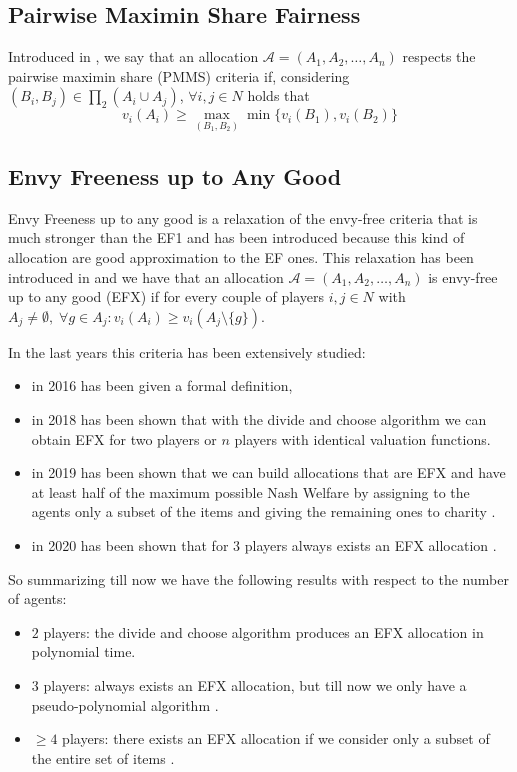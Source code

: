 \subsection{Pairwise Maximin Share Fairness}
Introduced in \cite{DBLP:/CaragiannisKMP016-EFX-PMMS}, we say that an allocation $\mathcal{A} = (A_1, A_2, \dots, A_n)$ respects the pairwise maximin share (PMMS) criteria if, considering $(B_i, B_j)\in \prod_2(A_i\cup A_j)$,  $\forall i,j\in N$ holds that 
$$
v_i(A_i) \ge \max_{(B_1, B_2)} \min \{v_i(B_1), v_i(B_2)\}
$$

\subsection{Envy Freeness up to Any Good}
Envy Freeness up to any good is a relaxation of the envy-free criteria that is much stronger than the EF1 and has been introduced because this kind of allocation are good approximation to the EF ones.  
This relaxation has been introduced in \cite{DBLP:/CaragiannisKMP016-EFX-PMMS} \cite{DBLP:GourvesMT14-EFX} and we have that an allocation $\mathcal{A} = (A_1, A_2, \dots, A_n)$ is envy-free up to any good (EFX) if for every couple of players $i,j\in N$ with $A_j\ne \emptyset, \; \forall g\in A_j: v_i(A_i)\ge v_i(A_j\setminus \{g\})$.

In the last years this criteria has been extensively studied: 
\begin{itemize}
    \item in 2016 has been given a formal definition,
    \item in 2018 has been shown that with the divide and choose algorithm \cite{DBLP:cut-and-choose-indivisible} we can obtain EFX for two players or $n$ players with identical valuation functions.
    \item in 2019 has been shown that we can build allocations that are EFX and have at least half of the maximum possible Nash Welfare by assigning to the agents only a subset of the items and giving the remaining ones to charity \cite{DBLP:efx-charity}.  
    \item in 2020 has been shown that for $3$ players always exists an EFX allocation \cite{DBLP:3p-efx-existance}.
\end{itemize}

So summarizing till now we have the following results with respect to the number of agents:
\begin{itemize}
    \item $2$ players: the divide and choose algorithm \cite{DBLP:cut-and-choose-indivisible} produces an EFX allocation in polynomial time.
    \item $3$ players: always exists an EFX allocation, but till now we only have a pseudo-polynomial algorithm \cite{DBLP:3p-efx-existance}.
    \item $\ge4$ players: there exists an EFX allocation if we consider only a subset of the entire set of items \cite{DBLP:efx-charity}.
\end{itemize}

